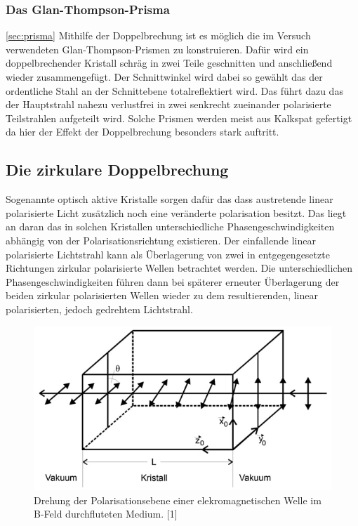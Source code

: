 \subsubsection{Das Glan-Thompson-Prisma}
\autoref{sec:prisma}
Mithilfe der Doppelbrechung ist es möglich die im Versuch verwendeten Glan-Thompson-Prismen zu konstruieren.
Dafür wird ein doppelbrechender Kristall schräg in zwei Teile geschnitten und anschließend wieder zusammengefügt.
Der Schnittwinkel wird dabei so gewählt das der ordentliche Stahl an der Schnittebene totalreflektiert wird.
Das führt dazu das der Hauptstrahl nahezu verlustfrei in zwei senkrecht zueinander polarisierte Teilstrahlen 
aufgeteilt wird. Solche Prismen werden meist aus Kalkspat gefertigt da hier der Effekt der Doppelbrechung besonders
stark auftritt.
\subsection{Die zirkulare Doppelbrechung}
\label{sec:zdoppelbrechung}
Sogenannte optisch aktive Kristalle sorgen dafür das dass austretende linear polarisierte Licht zusätzlich noch 
eine veränderte polarisation besitzt. Das liegt an daran das in solchen Kristallen unterschiedliche Phasengeschwindigkeiten
abhängig von der Polarisationsrichtung existieren. Der einfallende linear polarisierte Lichtstrahl kann als Überlagerung von 
zwei in entgegengesetzte Richtungen zirkular polarisierte Wellen betrachtet werden. Die unterschiedlichen 
Phasengeschwindigkeiten führen dann bei späterer erneuter Überlagerung der beiden zirkular polarisierten Wellen wieder
zu dem resultierenden, linear polarisierten, jedoch gedrehtem Lichtstrahl.

\begin{figure}
  \centering
  \includegraphics[width=1\textwidth]{content/grafiken/kristall.JPG}
  \caption{Drehung der Polarisationsebene einer elekromagnetischen Welle im B-Feld durchfluteten Medium. [1]}
  \label{fig:kristall}
\end{figure}

